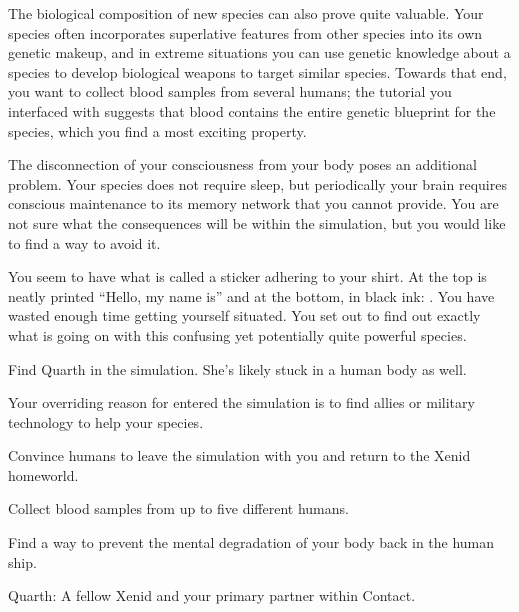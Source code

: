 \documentclass[char]{guildcamp1}
\begin{document}
The biological composition of new species can also prove quite valuable. Your species often incorporates superlative features from other species into its own genetic makeup, and in extreme situations you can use genetic knowledge about a species to develop biological weapons to target similar species. Towards that end, you want to collect blood samples from several humans; the tutorial you interfaced with suggests that blood contains the entire genetic blueprint for the species, which you find a most exciting property.

The disconnection of your consciousness from your body poses an additional problem. Your species does not require sleep, but periodically your brain requires conscious maintenance to its memory network that you cannot provide. You are not sure what the consequences will be within the simulation, but you would like to find a way to avoid it.

You seem to have what is called a sticker adhering to your shirt. At the top is neatly printed ``Hello, my name is'' and at the bottom, in black ink: \cAvtive{\intro}. You have wasted enough time getting yourself situated. You set out to find out exactly what is going on with this confusing yet potentially quite powerful species.

\begin{itemz}[Goals]
  \item Find Quarth in the simulation. She's likely stuck in a human body as well.
  \item Your overriding reason for entered the simulation is to find allies or military technology to help your species.
  \item Convince humans to leave the simulation with you and return to the Xenid homeworld.
  \item Collect blood samples from up to five different humans.
  \item Find a way to prevent the mental degradation of your body back in the human ship.
\end{itemz}


  
\begin{contacts}
  Quarth: A fellow Xenid and your primary partner within Contact.
\end{contacts}
\end{document}
